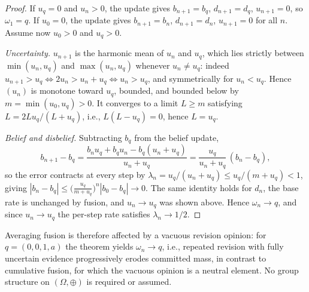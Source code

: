 \begin{proof}
If $u_q = 0$ and $u_n > 0$, the update gives $b_{n+1} = b_q$, $d_{n+1} = d_q$, $u_{n+1} = 0$, so $\omega_1 = q$. If $u_0 = 0$, the update gives $b_{n+1} = b_n$, $d_{n+1} = d_n$, $u_{n+1} = 0$ for all $n$. Assume now $u_0 > 0$ and $u_q > 0$.

\emph{Uncertainty.} $u_{n+1}$ is the harmonic mean of $u_n$ and $u_q$, which lies strictly between $\min(u_n, u_q)$ and $\max(u_n, u_q)$ whenever $u_n \neq u_q$: indeed $u_{n+1} > u_q \iff 2 u_n > u_n + u_q \iff u_n > u_q$, and symmetrically for $u_n < u_q$. Hence $(u_n)$ is monotone toward $u_q$, bounded, and bounded below by $m = \min(u_0, u_q) > 0$. It converges to a limit $L \geq m$ satisfying $L = 2 L u_q/(L + u_q)$, i.e., $L (L - u_q) = 0$, hence $L = u_q$.

\emph{Belief and disbelief.} Subtracting $b_q$ from the belief update,
\[
b_{n+1} - b_q
= \frac{b_n u_q + b_q u_n - b_q (u_n + u_q)}{u_n + u_q}
= \frac{u_q}{u_n + u_q}\, (b_n - b_q),
\]
so the error contracts at every step by $\lambda_n = u_q/(u_n+u_q) \leq u_q/(m+u_q) < 1$, giving $|b_n - b_q| \leq \big(\tfrac{u_q}{m+u_q}\big)^n |b_0 - b_q| \to 0$. The same identity holds for $d_n$, the base rate is unchanged by fusion, and $u_n \to u_q$ was shown above. Hence $\omega_n \to q$, and since $u_n \to u_q$ the per-step rate satisfies $\lambda_n \to 1/2$.
\end{proof}

Averaging fusion is therefore affected by a vacuous revision opinion: for $q = (0,0,1,a)$ the theorem yields $\omega_n \to q$, i.e., repeated revision with fully uncertain evidence progressively erodes committed mass, in contrast to cumulative fusion, for which the vacuous opinion is a neutral element. No group structure on $(\Omega, \oplus)$ is required or assumed.


